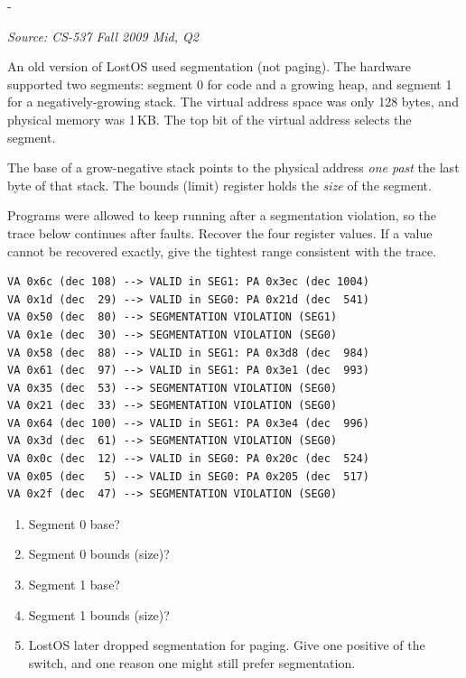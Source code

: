 \documentclass[11pt,a4paper]{article}
\makeatletter
\newcommand{\keepspace}[1]{\par\penalty-100\begingroup
  \setlength{\dimen@}{#1}\dimen@ii\pagegoal\advance\dimen@ii-\pagetotal
  \ifdim\dimen@>\dimen@ii\ifdim\dimen@ii>\z@\vfil\fi\break\fi\endgroup}
\newcounter{qn}[section]
\newenvironment{Qn}[4]{%
  \refstepcounter{qn}\keepspace{7\baselineskip}%
  \begin{tcolorbox}[qboxstyle, title={Q\thesection.\theqn\ \ [#1 \textbar\ #2]\ \ #4}]%
  {\footnotesize\color{g3}\textit{Source: #3}}\par\smallskip%
}{%
  \end{tcolorbox}%
}
\makeatother
\begin{document}
\begin{Qn}{Hard}{Lect 10}{CS-537 Fall 2009 Mid, Q2}{LostOS: reverse-engineer a two-segment (backward stack) translation}
An old version of LostOS used segmentation (not paging). The hardware
supported two segments: segment 0 for code and a growing heap, and
segment 1 for a negatively-growing stack. The virtual address space was
only 128 bytes, and physical memory was 1\,KB. The top bit of the
virtual address selects the segment.

The base of a grow-negative stack points to the physical address
\emph{one past} the last byte of that stack. The bounds (limit) register
holds the \emph{size} of the segment.

Programs were allowed to keep running after a segmentation violation, so
the trace below continues after faults. Recover the four register
values. If a value cannot be recovered exactly, give the tightest range
consistent with the trace.

\begin{lstlisting}[numbers=none]
VA 0x6c (dec 108) --> VALID in SEG1: PA 0x3ec (dec 1004)
VA 0x1d (dec  29) --> VALID in SEG0: PA 0x21d (dec  541)
VA 0x50 (dec  80) --> SEGMENTATION VIOLATION (SEG1)
VA 0x1e (dec  30) --> SEGMENTATION VIOLATION (SEG0)
VA 0x58 (dec  88) --> VALID in SEG1: PA 0x3d8 (dec  984)
VA 0x61 (dec  97) --> VALID in SEG1: PA 0x3e1 (dec  993)
VA 0x35 (dec  53) --> SEGMENTATION VIOLATION (SEG0)
VA 0x21 (dec  33) --> SEGMENTATION VIOLATION (SEG0)
VA 0x64 (dec 100) --> VALID in SEG1: PA 0x3e4 (dec  996)
VA 0x3d (dec  61) --> SEGMENTATION VIOLATION (SEG0)
VA 0x0c (dec  12) --> VALID in SEG0: PA 0x20c (dec  524)
VA 0x05 (dec   5) --> VALID in SEG0: PA 0x205 (dec  517)
VA 0x2f (dec  47) --> SEGMENTATION VIOLATION (SEG0)
\end{lstlisting}
\begin{enumerate}
  \item[(a)] Segment 0 base?
  \item[(b)] Segment 0 bounds (size)?
  \item[(c)] Segment 1 base?
  \item[(d)] Segment 1 bounds (size)?
  \item[(e)] LostOS later dropped segmentation for paging. Give one
        positive of the switch, and one reason one might still prefer
        segmentation.
\end{enumerate}
\end{Qn}
\end{document}
